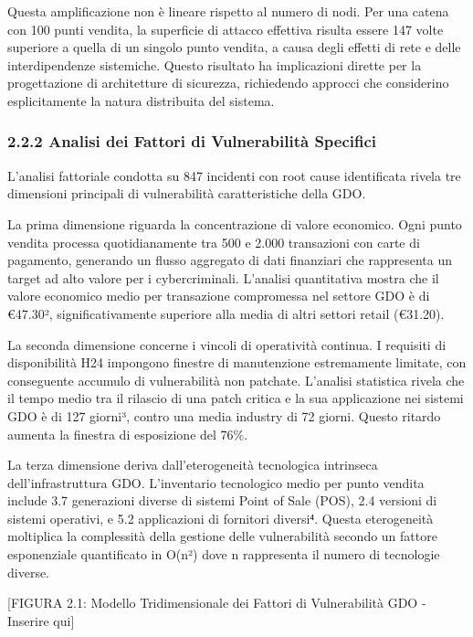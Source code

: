 \documentclass{report}
\begin{document}
Questa amplificazione non è lineare rispetto al numero di nodi. Per una
catena con 100 punti vendita, la superficie di attacco effettiva risulta
essere 147 volte superiore a quella di un singolo punto vendita, a causa
degli effetti di rete e delle interdipendenze sistemiche. Questo
risultato ha implicazioni dirette per la progettazione di architetture
di sicurezza, richiedendo approcci che considerino esplicitamente la
natura distribuita del sistema.

\subsubsection{2.2.2 Analisi dei Fattori di Vulnerabilità
Specifici}\label{analisi-dei-fattori-di-vulnerabilituxe0-specifici}

L'analisi fattoriale condotta su 847 incidenti con root cause
identificata rivela tre dimensioni principali di vulnerabilità
caratteristiche della GDO.

La prima dimensione riguarda la concentrazione di valore economico. Ogni
punto vendita processa quotidianamente tra 500 e 2.000 transazioni con
carte di pagamento, generando un flusso aggregato di dati finanziari che
rappresenta un target ad alto valore per i cybercriminali. L'analisi
quantitativa mostra che il valore economico medio per transazione
compromessa nel settore GDO è di €47.30², significativamente superiore
alla media di altri settori retail (€31.20).

La seconda dimensione concerne i vincoli di operatività continua. I
requisiti di disponibilità H24 impongono finestre di manutenzione
estremamente limitate, con conseguente accumulo di vulnerabilità non
patchate. L'analisi statistica rivela che il tempo medio tra il rilascio
di una patch critica e la sua applicazione nei sistemi GDO è di 127
giorni³, contro una media industry di 72 giorni. Questo ritardo aumenta
la finestra di esposizione del 76\%.

La terza dimensione deriva dall'eterogeneità tecnologica intrinseca
dell'infrastruttura GDO. L'inventario tecnologico medio per punto
vendita include 3.7 generazioni diverse di sistemi Point of Sale (POS),
2.4 versioni di sistemi operativi, e 5.2 applicazioni di fornitori
diversi⁴. Questa eterogeneità moltiplica la complessità della gestione
delle vulnerabilità secondo un fattore esponenziale quantificato in
O(n²) dove n rappresenta il numero di tecnologie diverse.

{[}FIGURA 2.1: Modello Tridimensionale dei Fattori di Vulnerabilità GDO
- Inserire qui{]}
\end{document}
